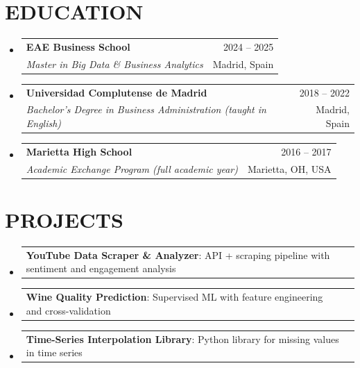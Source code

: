 \documentclass[a4paper,11pt]{article}
\makeatletter
\newcommand{\resumeSubheading}[4]{
  \vspace{-1pt}\item
    \begin{tabular*}{\textwidth}[t]{l@{\extracolsep{\fill}}r}
      \textbf{#1} & {\color{dark-grey}\small #2}\vspace{1pt}\\
      \textit{#3} & {\color{dark-grey}\small #4}\\
    \end{tabular*}\vspace{-5pt}
}
\newcommand{\resumeProject}[3]{
  \item
    \begin{tabular*}{\textwidth}{l@{\extracolsep{\fill}}r}
      \small\textbf{#1}{\small: #2} & {\color{dark-grey}\small #3}\\
    \end{tabular*}\vspace{-6pt}
}
\newcommand{\resumeSubHeadingListStart}{\begin{itemize}[leftmargin=0in, label={}]}
\newcommand{\resumeSubHeadingListEnd}{\end{itemize}}
\makeatother
\begin{document}
\section{EDUCATION}
  \resumeSubHeadingListStart
    \resumeSubheading
      {EAE Business School}{2024 -- 2025}
      {Master in Big Data \& Business Analytics}{Madrid, Spain}
    \resumeSubheading
      {Universidad Complutense de Madrid}{2018 -- 2022}
      {Bachelor's Degree in Business Administration (taught in English)}{Madrid, Spain}
    \resumeSubheading
      {Marietta High School}{2016 -- 2017}
      {Academic Exchange Program (full academic year)}{Marietta, OH, USA}
  \resumeSubHeadingListEnd
\vspace{-2pt}


\section{PROJECTS}
  \resumeSubHeadingListStart
    \resumeProject{YouTube Data Scraper \& Analyzer}{API + scraping pipeline with sentiment and engagement analysis}{\href{https://github.com/pabblo2000}{\faGithub}}
    \resumeProject{Wine Quality Prediction}{Supervised ML with feature engineering and cross-validation}{\href{https://github.com/pabblo2000}{\faGithub}}
    \resumeProject{Time-Series Interpolation Library}{Python library for missing values in time series}{\href{https://github.com/pabblo2000}{\faGithub}}
  \resumeSubHeadingListEnd
\end{document}
